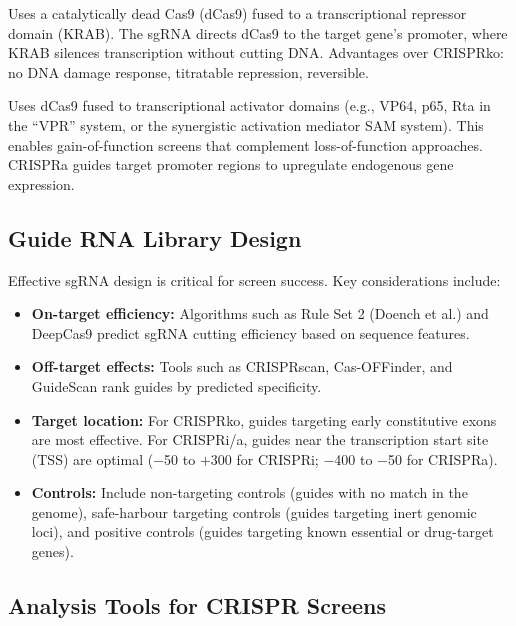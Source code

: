 \begin{description}[style=nextline, itemsep=3pt]
  \item[CRISPRi (CRISPR interference)] Uses a catalytically dead Cas9 (dCas9) fused to a transcriptional repressor domain (KRAB). The sgRNA directs dCas9 to the target gene's promoter, where KRAB silences transcription without cutting DNA. Advantages over CRISPRko: no DNA damage response, titratable repression, reversible.

  \item[CRISPRa (CRISPR activation)] Uses dCas9 fused to transcriptional activator domains (e.g., VP64, p65, Rta in the ``VPR'' system, or the synergistic activation mediator SAM system). This enables gain-of-function screens that complement loss-of-function approaches. CRISPRa guides target promoter regions to upregulate endogenous gene expression.
\end{description}

\subsection{Guide RNA Library Design}
\label{subsec:specialized:sgrna-design}

Effective sgRNA design is critical for screen success. Key considerations include:

\begin{itemize}[itemsep=2pt]
  \item \textbf{On-target efficiency:} Algorithms such as Rule Set 2 (Doench et al.) and DeepCas9 predict sgRNA cutting efficiency based on sequence features.
  \item \textbf{Off-target effects:} Tools such as CRISPRscan, Cas-OFFinder, and GuideScan rank guides by predicted specificity.
  \item \textbf{Target location:} For CRISPRko, guides targeting early constitutive exons are most effective. For CRISPRi/a, guides near the transcription start site (TSS) are optimal ($-$50 to $+$300\basepair{} for CRISPRi; $-$400 to $-$50\basepair{} for CRISPRa).
  \item \textbf{Controls:} Include non-targeting controls (guides with no match in the genome), safe-harbour targeting controls (guides targeting inert genomic loci), and positive controls (guides targeting known essential or drug-target genes).
\end{itemize}

\subsection{Analysis Tools for CRISPR Screens}
\label{subsec:specialized:crispr-tools}

